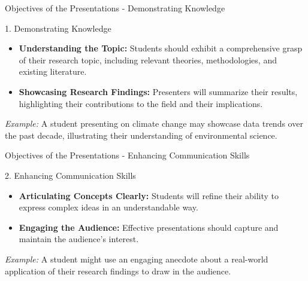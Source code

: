 \documentclass[aspectratio=169]{beamer}
\begin{document}
\begin{frame}[fragile]{Objectives of the Presentations - Demonstrating Knowledge}
  \begin{block}{1. Demonstrating Knowledge}
    \begin{itemize}
      \item \textbf{Understanding the Topic:} Students should exhibit a comprehensive grasp of their research topic, including relevant theories, methodologies, and existing literature.
      \item \textbf{Showcasing Research Findings:} Presenters will summarize their results, highlighting their contributions to the field and their implications.
    \end{itemize}
    
    \textit{Example:} A student presenting on climate change may showcase data trends over the past decade, illustrating their understanding of environmental science.
  \end{block}
\end{frame}

\begin{frame}[fragile]{Objectives of the Presentations - Enhancing Communication Skills}
  \begin{block}{2. Enhancing Communication Skills}
    \begin{itemize}
      \item \textbf{Articulating Concepts Clearly:} Students will refine their ability to express complex ideas in an understandable way.
      \item \textbf{Engaging the Audience:} Effective presentations should capture and maintain the audience's interest.
    \end{itemize}
    
    \textit{Example:} A student might use an engaging anecdote about a real-world application of their research findings to draw in the audience.
  \end{block}
\end{frame}
\end{document}
